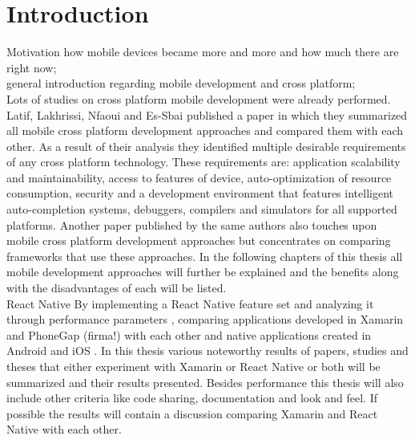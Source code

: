 \documentclass[Bachelor,BIF,english]{twbook}
\begin{document}
\chapter{Introduction}
Motivation how mobile devices became more and more and how much there are right now; 
\\[\baselineskip]
general introduction regarding mobile development and cross platform; 
\\[\baselineskip]
Lots of studies on cross platform mobile development were already performed. Latif, Lakhrissi, Nfaoui and Es-Sbai published a paper \cite{7479278} in which they summarized all mobile cross platform development approaches and compared them with each other. As a result of their analysis they identified multiple desirable requirements of any cross platform technology. These requirements are: application scalability and maintainability, access to features of device, auto-optimization of resource consumption, security and a development environment that features intelligent auto-completion systems, debuggers, compilers and simulators for all supported platforms. Another paper \cite{7934674} published by the same authors also touches upon mobile cross platform development approaches but concentrates on comparing frameworks that use these approaches. In the following chapters of this thesis all mobile development approaches will further be explained and the benefits along with the disadvantages of each will be listed.
\\[\baselineskip]
React Native By implementing a React Native feature set and analyzing it through performance parameters \cite{JohanssonSderberg2018}, comparing applications developed in Xamarin and PhoneGap (firma!) with each other and native applications created in Android and iOS \cite{Armgren_2015}. In this thesis various noteworthy results of papers, studies and theses \cite{Danielsson_2016} \cite{Axelsson2016} \cite{Hansson_Vidhall_2016} \cite{MartinezLecomte2018} \cite{ZubaBernhard2017EdPb} \cite{WillocxVossaertNaessens2015} \cite{MartinezLecomte2017} \cite{Dickson_2013} \cite{MartinezLecomte2018} \cite{GaouarBenamarBendimerad2016} that either experiment with Xamarin or React Native or both will be summarized and their results presented. Besides performance this thesis will also include other criteria like code sharing, documentation and look and feel. If possible the results will contain a discussion comparing Xamarin and React Native with each other. 
\end{document}
